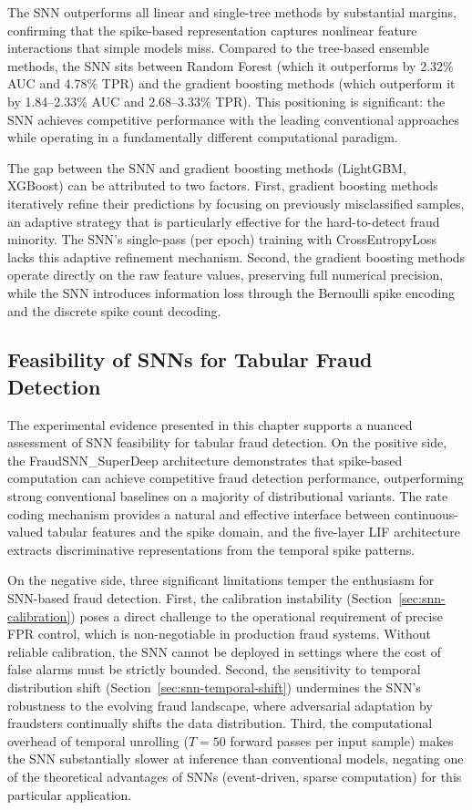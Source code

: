 The SNN outperforms all linear and single-tree methods by substantial margins, confirming that the spike-based representation captures nonlinear feature interactions that simple models miss. Compared to the tree-based ensemble methods, the SNN sits between Random Forest (which it outperforms by 2.32\% AUC and 4.78\% TPR) and the gradient boosting methods (which outperform it by 1.84--2.33\% AUC and 2.68--3.33\% TPR). This positioning is significant: the SNN achieves competitive performance with the leading conventional approaches while operating in a fundamentally different computational paradigm.

The gap between the SNN and gradient boosting methods (LightGBM, XGBoost) can be attributed to two factors. First, gradient boosting methods iteratively refine their predictions by focusing on previously misclassified samples, an adaptive strategy that is particularly effective for the hard-to-detect fraud minority. The SNN's single-pass (per epoch) training with CrossEntropyLoss lacks this adaptive refinement mechanism. Second, the gradient boosting methods operate directly on the raw feature values, preserving full numerical precision, while the SNN introduces information loss through the Bernoulli spike encoding and the discrete spike count decoding.

\subsection{Feasibility of SNNs for Tabular Fraud Detection}
\label{sec:snn-feasibility}

The experimental evidence presented in this chapter supports a nuanced assessment of SNN feasibility for tabular fraud detection. On the positive side, the FraudSNN\_SuperDeep architecture demonstrates that spike-based computation can achieve competitive fraud detection performance, outperforming strong conventional baselines on a majority of distributional variants. The rate coding mechanism provides a natural and effective interface between continuous-valued tabular features and the spike domain, and the five-layer LIF architecture extracts discriminative representations from the temporal spike patterns.

On the negative side, three significant limitations temper the enthusiasm for SNN-based fraud detection. First, the calibration instability (Section~\ref{sec:snn-calibration}) poses a direct challenge to the operational requirement of precise FPR control, which is non-negotiable in production fraud systems. Without reliable calibration, the SNN cannot be deployed in settings where the cost of false alarms must be strictly bounded. Second, the sensitivity to temporal distribution shift (Section~\ref{sec:snn-temporal-shift}) undermines the SNN's robustness to the evolving fraud landscape, where adversarial adaptation by fraudsters continually shifts the data distribution. Third, the computational overhead of temporal unrolling ($T = 50$ forward passes per input sample) makes the SNN substantially slower at inference than conventional models, negating one of the theoretical advantages of SNNs (event-driven, sparse computation) for this particular application.

